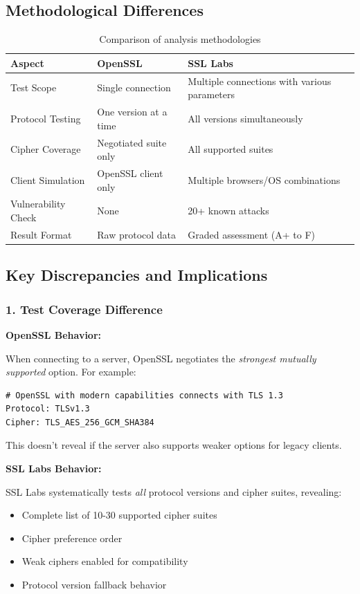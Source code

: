 \documentclass[12pt,a4paper]{article}
\begin{document}
\subsection{Methodological Differences}

\begin{table}[H]
\centering
\small
\begin{tabular}{@{}p{3.5cm}p{5cm}p{5cm}@{}}
\toprule
\textbf{Aspect} & \textbf{OpenSSL} & \textbf{SSL Labs} \\ \midrule
Test Scope & Single connection & Multiple connections with various parameters \\
Protocol Testing & One version at a time & All versions simultaneously \\
Cipher Coverage & Negotiated suite only & All supported suites \\
Client Simulation & OpenSSL client only & Multiple browsers/OS combinations \\
Vulnerability Check & None & 20+ known attacks \\
Result Format & Raw protocol data & Graded assessment (A+ to F) \\
\bottomrule
\end{tabular}
\caption{Comparison of analysis methodologies}
\end{table}

\subsection{Key Discrepancies and Implications}

\subsubsection{1. Test Coverage Difference}

\textbf{OpenSSL Behavior:}

When connecting to a server, OpenSSL negotiates the \textit{strongest mutually supported} option. For example:

\begin{lstlisting}[style=outputstyle]
# OpenSSL with modern capabilities connects with TLS 1.3
Protocol: TLSv1.3
Cipher: TLS_AES_256_GCM_SHA384
\end{lstlisting}

This doesn't reveal if the server also supports weaker options for legacy clients.

\textbf{SSL Labs Behavior:}

SSL Labs systematically tests \textit{all} protocol versions and cipher suites, revealing:
\begin{itemize}
    \item Complete list of 10-30 supported cipher suites
    \item Cipher preference order
    \item Weak ciphers enabled for compatibility
    \item Protocol version fallback behavior
\end{itemize}
\end{document}
